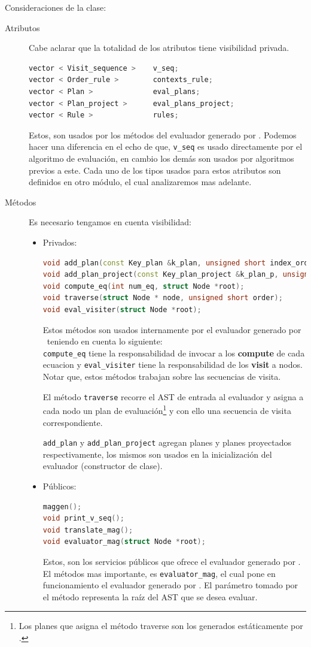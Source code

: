 Consideraciones de la clase:
\begin{description}
\item [Atributos] Cabe aclarar que la totalidad de los atributos tiene visibilidad privada.
\scriptsize 
\begin{lstlisting}[backgroundcolor=\color{white}, language=c++]
vector < Visit_sequence >    v_seq;
vector < Order_rule >        contexts_rule;
vector < Plan >              eval_plans;
vector < Plan_project >      eval_plans_project;
vector < Rule >              rules;
\end{lstlisting}
\normalsize
Estos, son usados por los métodos del evaluador generado por \maggen. Podemos hacer una diferencia en el echo de que, \texttt{v\_seq} es usado directamente por el algoritmo de evaluación, en cambio los demás son usados por algoritmos previos a este. Cada uno de los tipos usados para estos atributos son definidos en otro módulo, el cual analizaremos mas adelante.
\item [Métodos] Es necesario tengamos en cuenta visibilidad:
\begin{itemize}
\item Privados:
\scriptsize
\begin{lstlisting}[backgroundcolor=\color{white}, language=c++]
void add_plan(const Key_plan &k_plan, unsigned short index_order);
void add_plan_project(const Key_plan_project &k_plan_p, unsigned short index_order);
void compute_eq(int num_eq, struct Node *root);
void traverse(struct Node * node, unsigned short order);
void eval_visiter(struct Node *root);
\end{lstlisting}
\normalsize
Estos métodos son usados internamente por el evaluador generado por \maggen\ teniendo en cuenta lo siguiente:\\
\texttt{compute\_eq} tiene la responsabilidad de invocar a los \textbf{compute} de cada ecuacion y \texttt{eval\_visiter} tiene la responsabilidad de los \textbf{visit} a nodos. Notar que, estos métodos trabajan sobre las secuencias de visita.

El método \texttt{traverse} recorre el AST de entrada al evaluador y asigna a cada nodo un plan de evaluación\footnote{Los planes que asigna el método traverse son los generados estáticamente por \maggen.} y con ello una secuencia de visita correspondiente.

\texttt{add\_plan} y \texttt{add\_plan\_project} agregan planes y planes proyectados respectivamente, los mismos son usados en la inicialización del evaluador (constructor de clase).
\item Públicos:
\scriptsize
\begin{lstlisting}[backgroundcolor=\color{white}, language=c++]
maggen();
void print_v_seq();
void translate_mag();
void evaluator_mag(struct Node *root);
\end{lstlisting}
\normalsize
Estos, son los servicios públicos que ofrece el evaluador generado por \maggen. El métodos mas importante, es \texttt{evaluator\_mag}, el cual pone en funcionamiento el evaluador generado por \maggen. El parámetro tomado por el método representa la raíz del AST que se desea evaluar.


\end{itemize}
\end{description}
